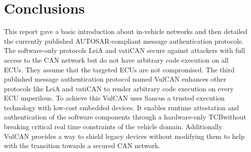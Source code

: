 
\section{Conclusions}

This report gave a basic introduction about in-vehicle networks and then
detailed the currently published AUTOSAR-compliant message authentication
protocols. The software-only protocols LeiA and vatiCAN secure against attackers
with full access to the CAN network but do not have arbitrary code execution on
all ECUs. They assume that the targeted ECUs are not compromised. The third
published message authentication protocol named VulCAN enhances other protocols
like LeiA and vatiCAN to render arbitrary code execution on every ECU
unperilous. To achieve this VulCAN uses Sancus a trusted execution technology
with low-cost embedded devices. It enables runtime attestation and
authentication of the software components through a hardware-only TCB\@ without
breaking critical real time constraints of the vehicle domain. Additionally
VulCAN provides a way to shield legacy devices without modifying them to help
with the transition towards a secured CAN network. 